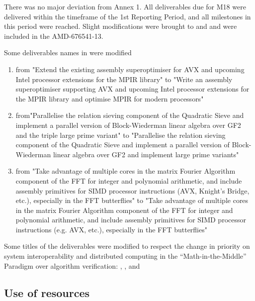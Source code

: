 \documentclass{deliverablereport}
\begin{document}
  There was no major deviation from Annex 1. All deliverables due for M18 were delivered
  within the timeframe of the 1st Reporting Period, and all milestones in this period were
  reached.  Slight modifications were brought to  and  and were
  included in the AMD-676541-13.


  Some deliverables names in  were modified
  \begin{enumerate}
  \item {} from "Extend the existing assembly
    superoptimiser for AVX and upcoming Intel processor extensions for the MPIR library"
    to "Write an assembly superoptimiser supporting AVX and upcoming Intel processor
    extensions for the MPIR library and optimise MPIR for modern processors"
  \item {} from"Parallelise the relation sieving component of the
    Quadratic Sieve and implement a parallel version of Block-Wiederman linear algebra
    over GF2 and the triple large prime variant" to "Parallelise the relation sieving
    component of the Quadratic Sieve and implement a parallel version of Block-Wiederman
    linear algebra over GF2 and implement large prime variants"
  \item {} from "Take advantage of multiple cores in the matrix Fourier
    Algorithm component of the FFT for integer and polynomial arithmetic, and include
    assembly primitives for SIMD processor instructions (AVX, Knight's Bridge, etc.),
    especially in the FFT butterflies" to "Take advantage of multiple cores in the matrix
    Fourier Algorithm component of the FFT for integer and polynomial arithmetic, and
    include assembly primitives for SIMD processor instructions (e.g. AVX, etc.),
    especially in the FFT butterflies"
  \end{enumerate}

  Some titles of the  deliverables were modified to respect the change in
  priority on system interoperability and distributed computing in the
  ``Math-in-the-Middle'' Paradigm over algorithm verification:
  , , and


  \subsection{Use of resources}
\end{document}
